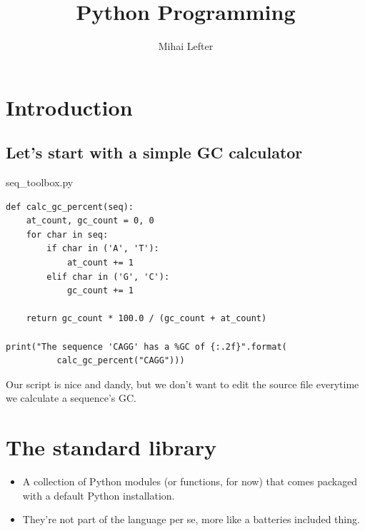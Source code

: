 \documentclass[aspectratio=1610,slidestop]{beamer}
\author{Mihai Lefter}
\title{Python Programming}
\begin{document}


\section{Introduction}
\makeTableOfContents

\subsection{Let's start with a simple GC calculator}
\begin{pframe}
 \begin{pythonfile}{seq\_toolbox.py}
  \begin{verbatim}
def calc_gc_percent(seq):
    at_count, gc_count = 0, 0
    for char in seq:
        if char in ('A', 'T'):
            at_count += 1
        elif char in ('G', 'C'):
            gc_count += 1

    return gc_count * 100.0 / (gc_count + at_count)

print("The sequence 'CAGG' has a %GC of {:.2f}".format(
          calc_gc_percent("CAGG")))
  \end{verbatim}
 \end{pythonfile}
 \pause
 Our script is nice and dandy, but we don't want to edit the source file
 everytime we calculate a sequence's GC.
\end{pframe}



\section{The standard library}

\begin{pframe}
\begin{itemize}
  \item A collection of Python modules (or functions, for now) that comes
  packaged with a default Python installation.
  \item They're not part of the language per se, more like a batteries included
  thing.
\end{itemize}

\end{pframe}
\end{document}
